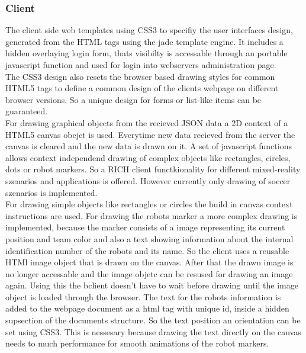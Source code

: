 \documentclass[journal]{IEEEtran}
\begin{document}
\subsubsection{Client}
The client side web templates using CSS3\cite{w3c-css3} to specifiy the
user interfaces design, generated from the HTML tags using the jade template
engine. It includes a hidden overlaying login form, thats visibilty is
accessable through an portable javascript function and used for login into webservers administration page.\\
The CSS3 design also resets the browser based drawing styles for common HTML5
tags to define a common design of the clients webpage on different browser
versions. So a unique design for forms or list-like items can be guaranteed.\\
For drawing graphical objects from the recieved JSON data a 2D context of a
HTML5 canvas obejct is used. Everytime new data recieved from the server the
canvas is cleared and the new data is drawn on it. A set of javascript functions
allows context independend drawing of complex objects like rectangles, circles,
dots or robot markers. So a RICH client\cite{rich-client} functkionality for
different mixed-reality szenarios and applications is offered. However currently only
drawing of soccer szenarios is implemented.\\
For drawing simple objects like  rectangles or circles the build in canvas
context instructions\cite{w3c-canvas} are used. For drawing the robots marker a
more complex drawing is implemented, because the marker consists of a image
representing its current position and team color and also a text showing
information about the internal identification number of the robots and its name.
So the client uses a reusable HTMl image object\cite{w3c-image} that is drawn on
the canvas. After that the drawn image is no longer accessable and the image
objetc can be resused for drawing an image again. Using this the bclient doesn't
have to wait before drawing until the image object is loaded through the
browser. The text for the robots information is added to the webpage document as
a html tag with unique id, inside a hidden supsection of the documents
structure. So the text position an orientation can be set using CSS3. This is
nessesary because drawing the text directly on the canvas needs to much
performance for smooth animations of the robot markers.
\end{document}
